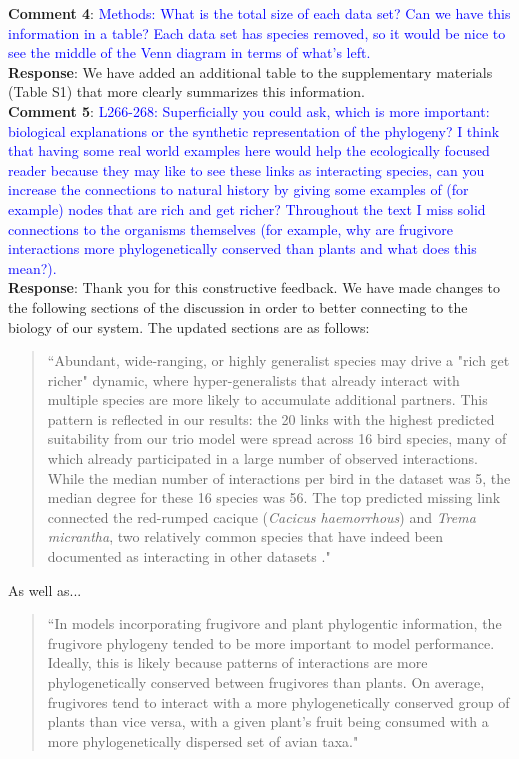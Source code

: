 \documentclass{article}
\begin{document}
\textbf{Comment 4}: \textcolor{blue}{Methods: What is the total size of each data set? Can we have this information in a table? Each data set has species removed, so it would be nice to see the middle of the Venn diagram in terms of what's left.}\\
\textbf{Response}: We have added an additional table to the supplementary materials (Table S1) that more clearly summarizes this information. 
\\
\textbf{Comment 5}: \textcolor{blue}{L266-268: Superficially you could ask, which is more important: biological explanations or the synthetic representation of the phylogeny? I think that having some real world examples here would help the ecologically focused reader because they may like to see these links as interacting species, can you increase the connections to natural history by giving some examples of (for example) nodes that are rich and get richer? Throughout the text I miss solid connections to the organisms themselves (for example, why are frugivore interactions more phylogenetically conserved than plants and what does this mean?).}
\\
\textbf{Response}: Thank you for this constructive feedback. We have made changes to the following sections of the discussion in order to better connecting to the biology of our system. The updated sections are as follows:

\begin{quote}
    ``Abundant, wide-ranging, or highly generalist species may drive a "rich get richer" dynamic, where hyper-generalists that already interact with multiple species are more likely to accumulate additional partners. This pattern is reflected in our results: the 20 links with the highest predicted suitability from our trio model were spread across 16 bird species, many of which already participated in a large number of observed interactions. While the median number of interactions per bird in the dataset was 5, the median degree for these 16 species was 56. The top predicted missing link connected the red-rumped cacique (\emph{Cacicus haemorrhous}) and \emph{Trema micrantha}, two relatively common species that have indeed been documented as interacting in other datasets \cite{fontanari2018rede}."
\end{quote}
As well as...
\begin{quote}
    ``In models incorporating frugivore and plant phylogentic information, the frugivore phylogeny tended to be more important to model performance. Ideally, this is likely because patterns of interactions are more phylogenetically conserved between frugivores than plants. On average, frugivores tend to interact with a more phylogenetically conserved group of plants than vice versa, with a given plant's fruit being consumed with a more phylogenetically dispersed set of avian taxa."
\end{quote}
\end{document}
